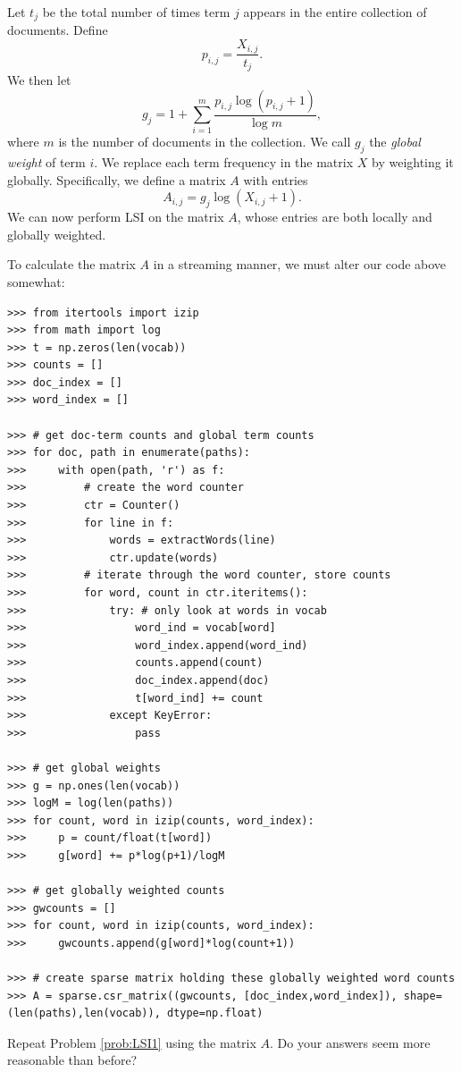 Let $t_{j}$ be the total number of times term $j$ appears in the entire
collection of documents.
Define
\begin{equation*}
p_{i,j} = \frac{X_{i,j}}{t_{j}}.
\end{equation*}
We then let
\begin{equation*}
g_{j} = 1 + \sum_{i=1}^{m} \frac{p_{i,j} \log (p_{i,j} + 1)}{\log m},
\end{equation*}
where $m$ is the number of documents in the collection.
We call $g_{j}$ the \emph{global weight} of term $i$.
We replace each term frequency in the matrix $X$ by weighting it globally.
Specifically, we define a matrix $A$ with entries
\begin{equation*}
A_{i,j} = g_{j} \log (X_{i,j} + 1).
\end{equation*}
We can now perform LSI on the matrix $A$, whose entries are both locally and globally weighted.

To calculate the matrix $A$ in a streaming manner, we must alter our code above somewhat:
\begin{lstlisting}
>>> from itertools import izip
>>> from math import log
>>> t = np.zeros(len(vocab))
>>> counts = []
>>> doc_index = []
>>> word_index = []

>>> # get doc-term counts and global term counts
>>> for doc, path in enumerate(paths):
>>>     with open(path, 'r') as f:
>>>         # create the word counter
>>>         ctr = Counter()
>>>         for line in f:
>>>             words = extractWords(line)
>>>             ctr.update(words)
>>>         # iterate through the word counter, store counts
>>>         for word, count in ctr.iteritems():
>>>             try: # only look at words in vocab
>>>                 word_ind = vocab[word]
>>>                 word_index.append(word_ind)
>>>                 counts.append(count)
>>>                 doc_index.append(doc)
>>>                 t[word_ind] += count
>>>             except KeyError:
>>>                 pass

>>> # get global weights
>>> g = np.ones(len(vocab))
>>> logM = log(len(paths))
>>> for count, word in izip(counts, word_index):
>>>     p = count/float(t[word])
>>>     g[word] += p*log(p+1)/logM

>>> # get globally weighted counts
>>> gwcounts = []
>>> for count, word in izip(counts, word_index):
>>>     gwcounts.append(g[word]*log(count+1))

>>> # create sparse matrix holding these globally weighted word counts
>>> A = sparse.csr_matrix((gwcounts, [doc_index,word_index]), shape=(len(paths),len(vocab)), dtype=np.float)
\end{lstlisting}

\begin{problem}
Repeat Problem \ref{prob:LSI1} using the matrix $A$. Do your answers seem more reasonable than before?
\end{problem}
